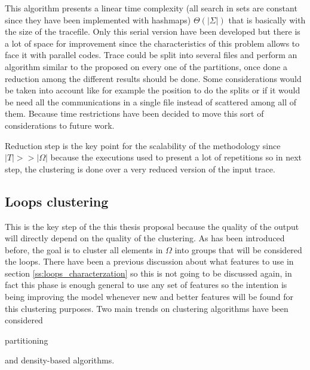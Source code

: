 This algorithm presents a linear time complexity (all search in sets are
constant since they have been implemented with hashmaps) $\Theta(|\Sigma|)$ that is
basically with the size of the tracefile. Only this serial version have been
developed but there is a lot of space for improvement since the characteristics
of this problem allows to face it with parallel codes. Trace could be split into
several files and perform an algorithm similar to the proposed on every one of
the partitions, once done a reduction among the different results should be
done. Some considerations would be taken into account like for example the
position to do the splits or if it would be need all the communications in a
single file instead of scattered among all of them. Because time restrictions
have been decided to move this sort of considerations to future work.

Reduction step is the key point for 
the scalability of the methodology since $|T| >> |\Omega|$ because the executions 
used to present a lot of repetitions so in next step, the clustering is done over a very 
reduced version of the input trace. 

\subsection{Loops clustering}

This is the key step of the this thesis proposal because the quality of the
output will directly depend on the quality of the clustering. As has been introduced
before, the goal is to cluster all elements in $\Omega$ into groups that will be
considered the loops. There have been a previous discussion about what features
to use in section \ref{ss:loops_characterzation} so this is not going to be
discussed again, in fact this phase is enough general to use any set of
features so the intention is being improving the model whenever new and better
features will be found for this clustering purposes. Two main trends on 
clustering algorithms have been considered \cite{rokach2005clustering}
\begin{enumerate*}[label=\roman*)]
  \item partitioning
  \item and density-based algorithms.
\end{enumerate*} 

